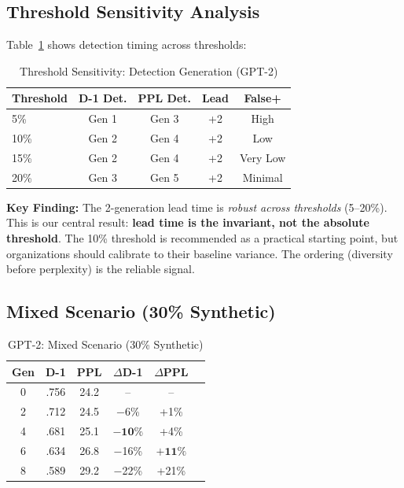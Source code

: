 \documentclass[conference]{IEEEtran}
\begin{document}
\subsection{Threshold Sensitivity Analysis}
\label{sec:sensitivity}

Table~\ref{tab:sensitivity} shows detection timing across thresholds:

\begin{table}[!t]
\caption{Threshold Sensitivity: Detection Generation (GPT-2)}
\label{tab:sensitivity}
\centering
\small
\begin{tabular}{@{}lcccc@{}}
\toprule
\textbf{Threshold} & \textbf{D-1 Det.} & \textbf{PPL Det.} & \textbf{Lead} & \textbf{False+} \\
\midrule
5\% & Gen 1 & Gen 3 & +2 & High \\
10\% & Gen 2 & Gen 4 & +2 & Low \\
15\% & Gen 2 & Gen 4 & +2 & Very Low \\
20\% & Gen 3 & Gen 5 & +2 & Minimal \\
\bottomrule
\end{tabular}
\end{table}

\textbf{Key Finding:} The 2-generation lead time is \textit{robust across thresholds} (5--20\%). This is our central result: \textbf{lead time is the invariant, not the absolute threshold}. The 10\% threshold is recommended as a practical starting point, but organizations should calibrate to their baseline variance. The ordering (diversity before perplexity) is the reliable signal.

\subsection{Mixed Scenario (30\% Synthetic)}

\begin{table}[!t]
\caption{GPT-2: Mixed Scenario (30\% Synthetic)}
\label{tab:mixed}
\centering
\small
\begin{tabular}{@{}cccccc@{}}
\toprule
\textbf{Gen} & \textbf{D-1} & \textbf{PPL} & \textbf{$\Delta$D-1} & \textbf{$\Delta$PPL} \\
\midrule
0 & .756 & 24.2 & -- & -- \\
2 & .712 & 24.5 & $-$6\% & +1\% \\
4 & .681 & 25.1 & $\mathbf{-10\%}$ & +4\% \\
6 & .634 & 26.8 & $-$16\% & $\mathbf{+11\%}$ \\
8 & .589 & 29.2 & $-$22\% & +21\% \\
\bottomrule
\end{tabular}
\end{table}
\end{document}
